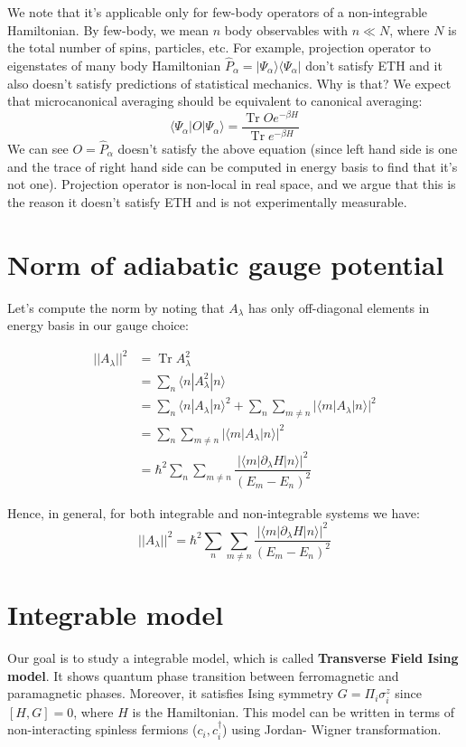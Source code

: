 \documentclass[11pt,a4paper]{article}
\DeclareMathOperator{\Tr}{Tr}
\begin{document}
We note that it's applicable only for few-body operators of a non-integrable Hamiltonian. By few-body, we mean $n$ body observables with $n \ll N$, where $N$ is the total number of spins, particles, etc. For example, projection operator to eigenstates of many body  Hamiltonian $\hat{P}_{\alpha}= |\Psi_{\alpha} \rangle \langle\Psi_{\alpha}  |$ don't satisfy ETH and it also doesn't satisfy predictions of statistical mechanics. Why is that? We expect that microcanonical averaging should be equivalent to canonical averaging:
\begin{equation}
 \langle\Psi_{\alpha}  |O|\Psi_{\alpha} \rangle= \dfrac{\Tr O e^{-\beta H}}{\Tr e^{-\beta H}}
\end{equation}
We can see $O= \hat{P}_{\alpha}$ doesn't satisfy the above equation (since left hand side is one and the trace of right hand side can be computed in energy basis to find that it's not one). Projection operator is non-local in real space, and we argue that this is the reason it doesn't satisfy ETH and is not experimentally measurable.




\section{Norm of adiabatic gauge potential}
Let's compute the norm by noting that $A_{\lambda}$ has only off-diagonal elements in energy basis in our gauge choice:

\begin{align}
||A_{\lambda}||^2 &= \Tr  A_{\lambda}^2 \\
&= \sum_n \langle n | A^2_{\lambda}| n \rangle \\
&= \sum_{n} \langle n | A_{\lambda}| n \rangle ^2 + \sum_n \sum_{m \neq n}  |\langle m | A_{\lambda}| n \rangle|^2 \\
&=  \sum_n \sum_{m \neq n}  |\langle m | A_{\lambda}| n \rangle|^2 \\
&= \hbar^2 \sum_n \sum_{m \neq n}  \dfrac{|\langle m | \partial_{\lambda}H| n \rangle|^2}{(E_m-E_n)^2} 
\end{align}

Hence, in general, for both integrable and non-integrable systems we have: 
\begin{equation}
\boxed{||A_{\lambda}||^2 = \hbar^2\sum_n \sum_{m \neq n}  \dfrac{|\langle m | \partial_{\lambda}H| n \rangle|^2}{(E_m-E_n)^2} }
\end{equation}


\section{Integrable model}
Our goal is to study a integrable model, which is called \textbf{Transverse Field Ising model}. It shows quantum phase transition between ferromagnetic and paramagnetic phases. Moreover, it satisfies Ising symmetry $G= \Pi_i \sigma_i^z$ since $[H, G]=0$, where $H$ is the Hamiltonian.
This model can be written in terms of non-interacting spinless fermions ($c_i, c^{\dagger}_i $) using Jordan- Wigner transformation. 
\end{document}

